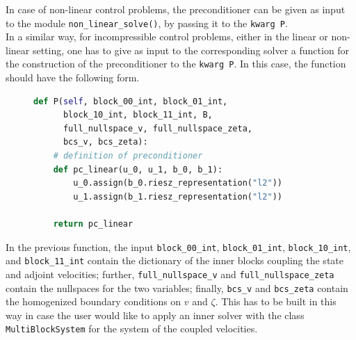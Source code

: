 \documentclass[letterpaper,10pt,english]{sphinxmanual}
\begin{document}
In case of non-linear control problems, the preconditioner can be given as input to the module \texttt{non{\_}linear{\_}solve()}, by passing it to the \texttt{kwarg P}.\\
In a similar way, for incompressible control problems, either in the linear or non-linear setting, one has to give as input to the corresponding solver a function for the construction of the preconditioner to the \texttt{kwarg P}. In this case, the function should have the following form.
\begin{figure}[!h]
\begin{lstlisting}[language=Python]
def P(self, block_00_int, block_01_int,
      block_10_int, block_11_int, B,
      full_nullspace_v, full_nullspace_zeta,
      bcs_v, bcs_zeta):
    # definition of preconditioner
    def pc_linear(u_0, u_1, b_0, b_1):
        u_0.assign(b_0.riesz_representation("l2"))
        u_1.assign(b_1.riesz_representation("l2"))

    return pc_linear
\end{lstlisting}
\end{figure}
\newpage
In the previous function, the input \texttt{block{\_}00{\_}int}, \texttt{block{\_}01{\_}int}, \texttt{block{\_}10{\_}int}, and \texttt{block{\_}11{\_}int} contain the dictionary of the inner blocks coupling the state and adjoint velocities; further, \texttt{full{\_}nullspace{\_}v} and \texttt{full{\_}nullspace{\_}zeta} contain the nullspaces for the two variables; finally, \texttt{bcs{\_}v} and \texttt{bcs{\_}zeta} contain the homogenized boundary conditions on $v$ and $\zeta$. This has to be built in this way in case the user would like to apply an inner solver with the class \texttt{MultiBlockSystem} for the system of the coupled velocities.
\end{document}
